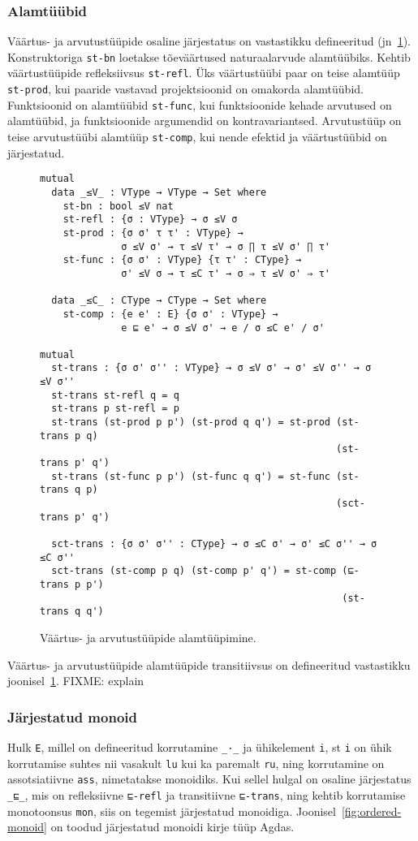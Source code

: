 \documentclass[a4paper,12pt]{article}
\begin{document}
\subsubsection{Alamtüübid}
Väärtus- ja arvutustüüpide osaline järjestatus on vastastikku defineeritud (jn~\ref{fig:exc.subtypes}).
Konstruktoriga {\tt st-bn} loetakse tõeväärtused naturaalarvude alamtüübiks.
Kehtib väärtustüüpide refleksiivsus {\tt st-refl}.
Üks väärtustüübi paar on teise alamtüüp {\tt st-prod}, kui paaride vastavad projektsioonid on omakorda alamtüübid.
Funktsioonid on alamtüübid {\tt st-func}, kui funktsioonide kehade arvutused on alamtüübid,
ja funktsioonide argumendid on kontravariantsed.
Arvutustüüp on teise arvutustüübi alamtüüp {\tt st-comp}, kui nende efektid ja väärtustüübid on järjestatud.
\begin{figure}
  \begin{verbatim}
mutual
  data _≤V_ : VType → VType → Set where
    st-bn : bool ≤V nat
    st-refl : {σ : VType} → σ ≤V σ
    st-prod : {σ σ' τ τ' : VType} →
              σ ≤V σ' → τ ≤V τ' → σ ∏ τ ≤V σ' ∏ τ'
    st-func : {σ σ' : VType} {τ τ' : CType} →
              σ' ≤V σ → τ ≤C τ' → σ ⇒ τ ≤V σ' ⇒ τ'

  data _≤C_ : CType → CType → Set where
    st-comp : {e e' : E} {σ σ' : VType} →
              e ⊑ e' → σ ≤V σ' → e / σ ≤C e' / σ'

mutual
  st-trans : {σ σ' σ'' : VType} → σ ≤V σ' → σ' ≤V σ'' → σ ≤V σ''
  st-trans st-refl q = q
  st-trans p st-refl = p
  st-trans (st-prod p p') (st-prod q q') = st-prod (st-trans p q)
                                                   (st-trans p' q')
  st-trans (st-func p p') (st-func q q') = st-func (st-trans q p)
                                                   (sct-trans p' q')

  sct-trans : {σ σ' σ'' : CType} → σ ≤C σ' → σ' ≤C σ'' → σ ≤C σ''
  sct-trans (st-comp p q) (st-comp p' q') = st-comp (⊑-trans p p')
                                                    (st-trans q q')\end{verbatim}
  \caption{Väärtus- ja arvutustüüpide alamtüüpimine.}
  \label{fig:exc.subtypes}
\end{figure}

Väärtus- ja arvutustüüpide alamtüüpide transitiivsus on defineeritud vastastikku joonisel~\ref{fig:exc.subtypes}.
FIXME: explain

\subsubsection{Järjestatud monoid}
Hulk {\tt E}, millel on defineeritud korrutamine {\tt _·_} ja ühikelement {\tt i},
st {\tt i} on ühik korrutamise suhtes nii vasakult {\tt lu} kui ka paremalt {\tt ru},
ning korrutamine on assotsiatiivne {\tt ass}, nimetatakse monoidiks.
Kui sellel hulgal on osaline järjestatus {\tt _⊑_},
mis on refleksiivne {\tt ⊑-refl} ja transitiivne {\tt ⊑-trans},
ning kehtib korrutamise monotoonsus {\tt mon},
siis on tegemist järjestatud monoidiga.
Joonisel~\ref{fig:ordered-monoid} on toodud järjestatud monoidi kirje tüüp Agdas.
\end{document}
